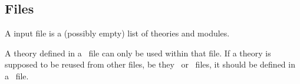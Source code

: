 \subsection{Files}

A \whyml input file is a (possibly empty) list of theories and modules.
\begin{center}\framebox{}\end{center}
A theory defined in a \whyml\ file can only be used within that
file. If a theory is supposed to be reused from other files, be they
\why\ or \whyml\ files, it should be defined in a \why\ file.

